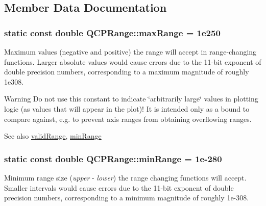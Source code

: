 \subsection{Member Data Documentation}
\subsubsection[{\texorpdfstring{max\+Range}{maxRange}}]{\setlength{\rightskip}{0pt plus 5cm}static const double Q\+C\+P\+Range\+::max\+Range = 1e250\hspace{0.3cm}{\ttfamily [static]}}\hypertarget{class_q_c_p_range_a34c2817056d5eb5c32524e34a85b4255}{}\label{class_q_c_p_range_a34c2817056d5eb5c32524e34a85b4255}
Maximum values (negative and positive) the range will accept in range-\/changing functions. Larger absolute values would cause errors due to the 11-\/bit exponent of double precision numbers, corresponding to a maximum magnitude of roughly 1e308.

\begin{DoxyWarning}{Warning}
Do not use this constant to indicate \char`\"{}arbitrarily large\char`\"{} values in plotting logic (as values that will appear in the plot)! It is intended only as a bound to compare against, e.\+g. to prevent axis ranges from obtaining overflowing ranges.
\end{DoxyWarning}
\begin{DoxySeeAlso}{See also}
\hyperlink{class_q_c_p_range_ab38bd4841c77c7bb86c9eea0f142dcc0}{valid\+Range}, \hyperlink{class_q_c_p_range_a95e4931d712418c3020517cbec669ed1}{min\+Range} 
\end{DoxySeeAlso}
\subsubsection[{\texorpdfstring{min\+Range}{minRange}}]{\setlength{\rightskip}{0pt plus 5cm}static const double Q\+C\+P\+Range\+::min\+Range = 1e-\/280\hspace{0.3cm}{\ttfamily [static]}}\hypertarget{class_q_c_p_range_a95e4931d712418c3020517cbec669ed1}{}\label{class_q_c_p_range_a95e4931d712418c3020517cbec669ed1}
Minimum range size ({\itshape upper} -\/ {\itshape lower}) the range changing functions will accept. Smaller intervals would cause errors due to the 11-\/bit exponent of double precision numbers, corresponding to a minimum magnitude of roughly 1e-\/308.

